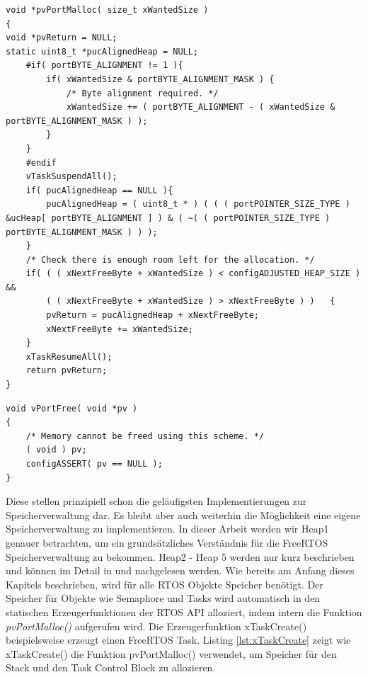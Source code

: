 \begin{lstlisting}[caption={FreeRTOS Source von pvPortMalloc() aus Heap1.c. Zuerst wird sichergestellt, dass die Startspeicheradresse dem byte-Alignment des $\mu$\-Pro\-zesso\-rs entspricht. Der STM32F4 ist ein 32Bit $\mu$\-Pro\-zesso\-r und hat ein byte-Alignment von 4, sodass die Startadresse immer eine Potenz von 4 sein muss. Danach wird der Scheduler deaktiviert und geprüft, ob genug Speicher zur Verfügung steht. Abschließend wird der Speicher im ucHeap reserviert.  }, linewidth=8cm,captionpos=b, label=lst:malloc2, float=htb]
void *pvPortMalloc( size_t xWantedSize )
{
void *pvReturn = NULL;
static uint8_t *pucAlignedHeap = NULL;
	#if( portBYTE_ALIGNMENT != 1 ){
		if( xWantedSize & portBYTE_ALIGNMENT_MASK )	{
			/* Byte alignment required. */
			xWantedSize += ( portBYTE_ALIGNMENT - ( xWantedSize & portBYTE_ALIGNMENT_MASK ) );
		}
	}
	#endif
	vTaskSuspendAll();
	if( pucAlignedHeap == NULL ){
		pucAlignedHeap = ( uint8_t * ) ( ( ( portPOINTER_SIZE_TYPE ) &ucHeap[ portBYTE_ALIGNMENT ] ) & ( ~( ( portPOINTER_SIZE_TYPE ) portBYTE_ALIGNMENT_MASK ) ) );
	}
	/* Check there is enough room left for the allocation. */
	if( ( ( xNextFreeByte + xWantedSize ) < configADJUSTED_HEAP_SIZE ) &&
		( ( xNextFreeByte + xWantedSize ) > xNextFreeByte )	)	{
		pvReturn = pucAlignedHeap + xNextFreeByte;
		xNextFreeByte += xWantedSize;
	}
	xTaskResumeAll();
	return pvReturn;
}
\end{lstlisting}
\begin{lstlisting}[caption={FreeRTOS Source von vPortFree() aus Heap1.c . Da eine Speicherfreigabe in Heap1 nicht vorgesehen ist, ist diese Funktion leer.}, linewidth=8cm,captionpos=b, label=lst:free2, float=htb]
void vPortFree( void *pv )
{
	/* Memory cannot be freed using this scheme. */
	( void ) pv;
	configASSERT( pv == NULL );
}
\end{lstlisting} 
Diese stellen prinzipiell schon die ge\-läu\-figsten Implementierungen zur Speicherverwaltung dar. Es bleibt aber auch weiterhin die Möglichkeit eine eigene Speicherverwaltung zu implementieren. In dieser Arbeit werden wir Heap1 genauer betrachten, um ein grund\-sätz\-liches Verständnis für die FreeRTOS Speicherverwaltung zu bekommen. Heap2 - Heap 5 werden nur kurz beschrieben und können im Detail in \cite{MasteringFreeRtos} und \cite{FreeRtosAdvanced} nachgelesen werden. Wie bereits am Anfang dieses Kapitels beschrieben, wird für alle RTOS Objekte Speicher benötigt. Der Speicher für Objekte wie Semaphore und Tasks wird automatisch in den statischen Erzeugerfunktionen der RTOS API alloziert, indem intern die Funktion \textit{pvPortMalloc()} aufgerufen wird. Die Erzeugerfunktion xTaskCreate() beispielsweise erzeugt einen FreeRTOS Task. Listing \ref{lst:xTaskCreate} zeigt wie xTaskCreate() die Funktion pvPortMalloc() verwendet, um Speicher für den Stack und den Task Control Block zu allozieren.
